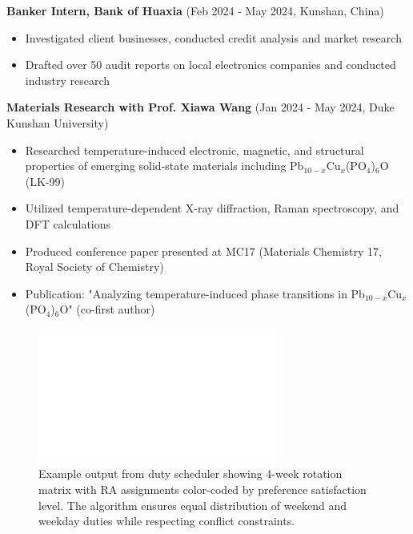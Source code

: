 \vspace{0.5em}

\textbf{Banker Intern, Bank of Huaxia} (Feb 2024 - May 2024, Kunshan, China)
\begin{itemize}[leftmargin=1.2em, itemsep=0.1em]
  \item Investigated client businesses, conducted credit analysis and market research
  \item Drafted over 50 audit reports on local electronics companies and conducted industry research
\end{itemize}

\vspace{0.5em}

\textbf{Materials Research with Prof. Xiawa Wang} (Jan 2024 - May 2024, Duke Kunshan University)
\begin{itemize}[leftmargin=1.2em, itemsep=0.1em]
  \item Researched temperature-induced electronic, magnetic, and structural properties of emerging solid-state materials including Pb$_{10-x}$Cu$_x$(PO$_4$)$_6$O (LK-99)
  \item Utilized temperature-dependent X-ray diffraction, Raman spectroscopy, and DFT calculations
  \item Produced conference paper presented at MC17 (Materials Chemistry 17, Royal Society of Chemistry)
  \item Publication: "Analyzing temperature-induced phase transitions in Pb$_{10-x}$Cu$_x$(PO$_4$)$_6$O" (co-first author)
\end{itemize}

\begin{figure}[h]
\centering
\includegraphics[width=0.7\textwidth]{assets/placeholder_1600x900.png}
\caption{Example output from duty scheduler showing 4-week rotation matrix with RA assignments color-coded by preference satisfaction level. The algorithm ensures equal distribution of weekend and weekday duties while respecting conflict constraints.}
\end{figure}

